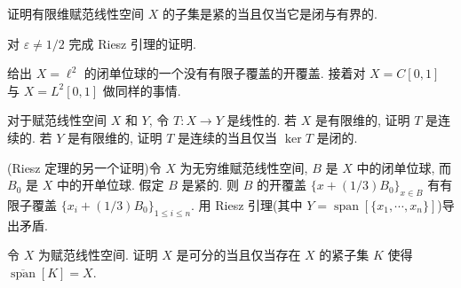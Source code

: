 \documentclass[../../main.tex]{subfiles}
\begin{document}
\begin{exercise}\label{exercise:ch13-23}
证明有限维赋范线性空间 $X$ 的子集是紧的当且仅当它是闭与有界的.
\end{exercise}

\begin{exercise}\label{exercise:ch13-24}
对 $\varepsilon\neq 1/2$ 完成 Riesz 引理的证明.
\end{exercise}

\begin{exercise}\label{exercise:ch13-25}
给出 $X=\ell^{2}$ 的闭单位球的一个没有有限子覆盖的开覆盖. 接着对 $X=C[0,1]$ 与 $X=L^{2}[0,1]$ 做同样的事情.
\end{exercise}

\begin{exercise}\label{exercise:ch13-26}
对于赋范线性空间 $X$ 和 $Y$, 令 $T:X\to Y$ 是线性的. 若 $X$ 是有限维的, 证明 $T$ 是连续的. 若 $Y$ 是有限维的, 证明 $T$ 是连续的当且仅当 $\ker T$ 是闭的.
\end{exercise}

\begin{exercise}\label{exercise:ch13-27}
(Riesz 定理的另一个证明)令 $X$ 为无穷维赋范线性空间, $B$ 是 $X$ 中的闭单位球, 而 $B_{0}$ 是 $X$ 中的开单位球. 假定 $B$ 是紧的. 则 $B$ 的开覆盖 $\{x+(1/3)B_{0}\}_{x\in B}$ 有有限子覆盖 $\{x_{i}+(1/3)B_{0}\}_{1\leqslant i\leqslant n}$. 用 Riesz 引理(其中 $Y=\operatorname{span}[\{x_{1},\cdots,x_{n}\}]$)导出矛盾.
\end{exercise}

\begin{exercise}\label{exercise:ch13-28}
令 $X$ 为赋范线性空间. 证明 $X$ 是可分的当且仅当存在 $X$ 的紧子集 $K$ 使得 $\overline{\operatorname{span}}[K]=X$.
\end{exercise}
\end{document}
